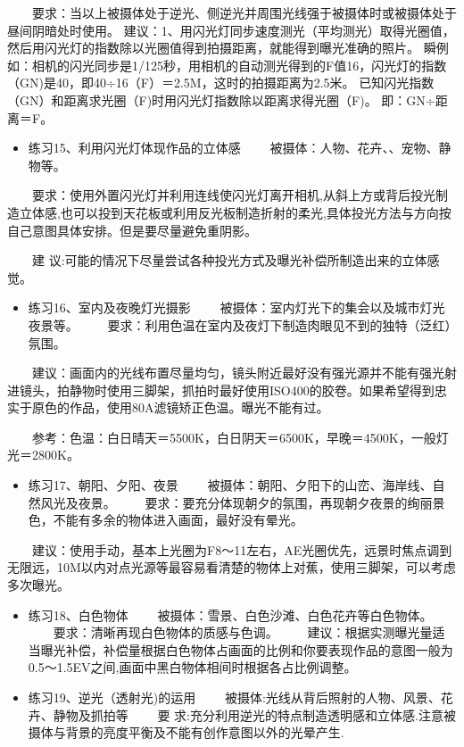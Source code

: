 \documentclass[
  letterpaper,
  DIV=11,
  numbers=noendperiod]{scrreprt}
\providecommand{\tightlist}{%
  \setlength{\itemsep}{0pt}\setlength{\parskip}{0pt}}\usepackage{longtable,booktabs,array}
\begin{document}
　　要求：当以上被摄体处于逆光、侧逆光并周围光线强于被摄体时或被摄体处于昼间阴暗处时使用。
建议：1、用闪光灯同步速度测光（平均测光）取得光圈值，然后用闪光灯的指数除以光圈值得到拍摄距离，就能得到曝光准确的照片。
瞬例如：相机的闪光同步是1/125秒，用相机的自动测光得到的F值16，闪光灯的指数（GN)是40，即40÷16（F）＝2.5M，这时的拍摄距离为2.5米。
已知闪光指数（GN）和距离求光圈（F)时用闪光灯指数除以距离求得光圈（F)。
即：GN÷距离＝F。

\begin{itemize}
\tightlist
\item
  练习15、利用闪光灯体现作品的立体感
  　　被摄体：人物、花卉、、宠物、静物等。
\end{itemize}

　　要求：使用外置闪光灯并利用连线使闪光灯离开相机,从斜上方或背后投光制造立体感,也可以投到天花板或利用反光板制造折射的柔光,具体投光方法与方向按自己意图具体安排。但是要尽量避免重阴影。

　　建
议:可能的情况下尽量尝试各种投光方式及曝光补偿所制造出来的立体感觉。

\begin{itemize}
\tightlist
\item
  练习16、室内及夜晚灯光摄影
  　　被摄体：室内灯光下的集会以及城市灯光夜景等。
  　　要求：利用色温在室内及夜灯下制造肉眼见不到的独特（泛红）氛围。
\end{itemize}

　　建议：画面内的光线布置尽量均匀，镜头附近最好没有强光源并不能有强光射进镜头，拍静物时使用三脚架，抓拍时最好使用ISO400的胶卷。如果希望得到忠实于原色的作品，使用80A滤镜矫正色温。曝光不能有过。

　　参考：色温：白日晴天＝5500K，白日阴天＝6500K，早晚＝4500K，一般灯光＝2800K。

\begin{itemize}
\tightlist
\item
  练习17、朝阳、夕阳、夜景
  　　被摄体：朝阳、夕阳下的山峦、海岸线、自然风光及夜景。
  　　要求：要充分体现朝夕的氛围，再现朝夕夜景的绚丽景色，不能有多余的物体进入画面，最好没有晕光。
\end{itemize}

　　建议：使用手动，基本上光圈为F8～11左右，AE光圈优先，远景时焦点调到无限远，10M以内对点光源等最容易看清楚的物体上对蕉，使用三脚架，可以考虑多次曝光。

\begin{itemize}
\item
  练习18、白色物体 　　被摄体：雪景、白色沙滩、白色花卉等白色物体。
  　　要求：清晰再现白色物体的质感与色调。
  　　建议：根据实测曝光量适当曝光补偿，补偿量根据白色物体占画面的比例和你要表现作品的意图一般为0.5～1.5EV之间,画面中黑白物体相间时根据各占比例调整。
\item
  练习19、逆光（透射光)的运用
  　　被摄体:光线从背后照射的人物、风景、花卉、静物及抓拍等 　　要
  求:充分利用逆光的特点制造透明感和立体感.注意被摄体与背景的亮度平衡及不能有创作意图以外的光晕产生.
\end{itemize}
\end{document}

